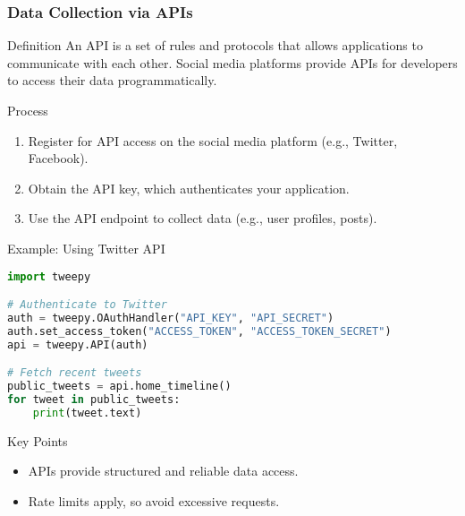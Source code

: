 \documentclass{beamer}
\begin{document}
\begin{frame}[fragile]
    \frametitle{Data Collection via APIs}
    \begin{block}{Definition}
        An API is a set of rules and protocols that allows applications to communicate with each other. 
        Social media platforms provide APIs for developers to access their data programmatically.
    \end{block}
    
    \begin{block}{Process}
        \begin{enumerate}
            \item Register for API access on the social media platform (e.g., Twitter, Facebook).
            \item Obtain the API key, which authenticates your application.
            \item Use the API endpoint to collect data (e.g., user profiles, posts).
        \end{enumerate}
    \end{block}

    \begin{block}{Example: Using Twitter API}
        \begin{lstlisting}[language=Python]
import tweepy

# Authenticate to Twitter
auth = tweepy.OAuthHandler("API_KEY", "API_SECRET")
auth.set_access_token("ACCESS_TOKEN", "ACCESS_TOKEN_SECRET")
api = tweepy.API(auth)

# Fetch recent tweets
public_tweets = api.home_timeline()
for tweet in public_tweets:
    print(tweet.text)
        \end{lstlisting}
    \end{block}

    \begin{block}{Key Points}
        \begin{itemize}
            \item APIs provide structured and reliable data access.
            \item Rate limits apply, so avoid excessive requests.
        \end{itemize}
    \end{block}
\end{frame}
\end{document}

